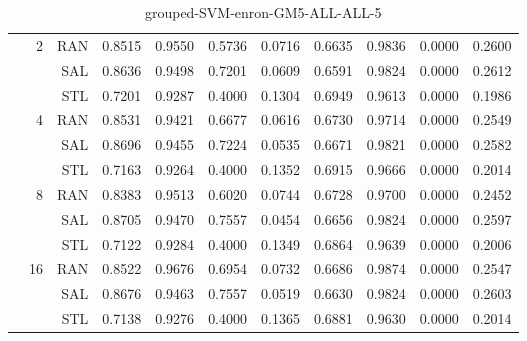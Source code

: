 \begin{center}
\begin{table}[htbp]
\begin{center}
\begin{tabular}{ | r | r | r | r | r | r | r | r | r | r | r |}
 & \multirow{3}{*}{2} & RAN & 0.8515 & 0.9550 & 0.5736 & 0.0716 & 0.6635 & 0.9836 & 0.0000 & 0.2600\\ \cline{3-11}
 &   & SAL & 0.8636 & 0.9498 & 0.7201 & 0.0609 & 0.6591 & 0.9824 & 0.0000 & 0.2612\\ \cline{3-11}
 &   & STL & 0.7201 & 0.9287 & 0.4000 & 0.1304 & 0.6949 & 0.9613 & 0.0000 & 0.1986\\ \cline{2-11}
 & \multirow{3}{*}{4} & RAN & 0.8531 & 0.9421 & 0.6677 & 0.0616 & 0.6730 & 0.9714 & 0.0000 & 0.2549\\ \cline{3-11}
 &   & SAL & 0.8696 & 0.9455 & 0.7224 & 0.0535 & 0.6671 & 0.9821 & 0.0000 & 0.2582\\ \cline{3-11}
 &   & STL & 0.7163 & 0.9264 & 0.4000 & 0.1352 & 0.6915 & 0.9666 & 0.0000 & 0.2014\\ \cline{2-11}
 & \multirow{3}{*}{8} & RAN & 0.8383 & 0.9513 & 0.6020 & 0.0744 & 0.6728 & 0.9700 & 0.0000 & 0.2452\\ \cline{3-11}
 &   & SAL & 0.8705 & 0.9470 & 0.7557 & 0.0454 & 0.6656 & 0.9824 & 0.0000 & 0.2597\\ \cline{3-11}
 &   & STL & 0.7122 & 0.9284 & 0.4000 & 0.1349 & 0.6864 & 0.9639 & 0.0000 & 0.2006\\ \cline{2-11}
 & \multirow{3}{*}{16} & RAN & 0.8522 & 0.9676 & 0.6954 & 0.0732 & 0.6686 & 0.9874 & 0.0000 & 0.2547\\ \cline{3-11}
 &   & SAL & 0.8676 & 0.9463 & 0.7557 & 0.0519 & 0.6630 & 0.9824 & 0.0000 & 0.2603\\ \cline{3-11}
 &   & STL & 0.7138 & 0.9276 & 0.4000 & 0.1365 & 0.6881 & 0.9630 & 0.0000 & 0.2014\\ \cline{2-11}
\hline
\end{tabular}
\caption{grouped-SVM-enron-GM5-ALL-ALL-5}
\end{center}
 \end{table}
\end{center}

